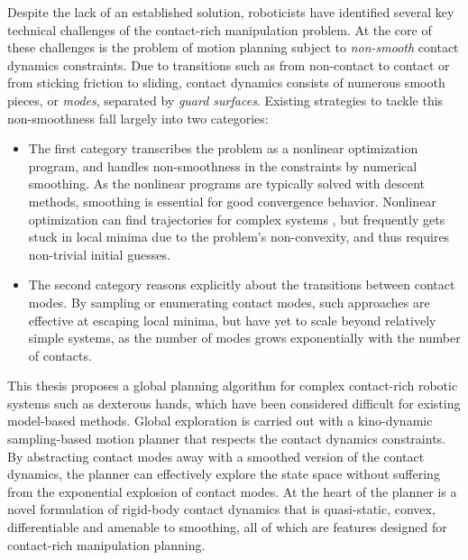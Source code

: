Despite the lack of an established solution, roboticists have identified several key technical challenges of the contact-rich manipulation problem. At the core of these challenges is the problem of motion planning subject to \emph{non-smooth} contact dynamics constraints. Due to transitions such as from non-contact to contact or from sticking friction to sliding, contact dynamics consists of numerous smooth pieces, or \emph{modes}, separated by \emph{guard surfaces}. Existing strategies to tackle this non-smoothness fall largely into two categories:
\begin{itemize}
\item The first category transcribes the problem as a nonlinear optimization program, and handles non-smoothness in the constraints by numerical smoothing. As the nonlinear programs are typically solved with descent methods, smoothing is essential for good convergence behavior. 
Nonlinear optimization can find trajectories for complex systems \cite{posa2014direct}, but frequently gets stuck in local minima due to the problem's non-convexity, and thus requires non-trivial initial guesses.

\item The second category reasons explicitly about the transitions between contact modes. By sampling \cite{cheng2021contact} or enumerating \cite{marcucci2017approximate} contact modes, such approaches are effective at escaping local minima, but have yet to scale beyond relatively simple systems, as the number of modes grows exponentially with the number of contacts.
\end{itemize}


This thesis proposes a global planning algorithm for complex contact-rich robotic systems such as dexterous hands, which have been considered difficult for existing model-based methods.
Global exploration is carried out with a kino-dynamic sampling-based motion planner that respects the contact dynamics constraints.
By abstracting contact modes away with a smoothed version of the contact dynamics, the planner can effectively explore the state space without suffering from the exponential explosion of contact modes. 
At the heart of the planner is a novel formulation of rigid-body contact dynamics that is quasi-static, convex, differentiable and amenable to smoothing, all of which are features designed for contact-rich manipulation planning.

